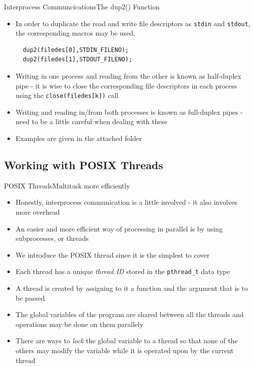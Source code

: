 \documentclass{beamer}
\begin{document}
\begin{frame}[fragile]{Interprocess Communcications}{The dup2()
    Function}
  \begin{itemize}
    \item In order to duplicate the read and write file descriptors as
      \verb|stdin| and \verb|stdout|, the corresponding macros may be
      used,
\begin{verbatim}
  dup2(filedes[0],STDIN_FILENO);
  dup2(filedes[1],STDOUT_FILENO); 
\end{verbatim}
  \item Writing in one process and reading from the other is known as
    half-duplex pipe - it is wise to close the corresponding file
    descriptors in each process using the \verb|close(filedes[k])| call
  \item Writing and reading in/from both processes is known as
    full-duplex pipes - need to be a little careful when dealing with
    these
  \item Examples are given in the attached folder
  \end{itemize}
\end{frame}

\subsection{Working with POSIX Threads}
\begin{frame}[fragile]{POSIX Threads}{Multitask more efficiently}
  \begin{itemize}
    \item Honestly, interprocess communication is a little involved -
      it also involves more overhead
    \item An easier and more efficient way of processing in parallel
      is by using subprocesses, or threads
    \item We introduce the POSIX thread since it is the simplest to
      cover
    \item Each thread has a unique \emph{thread ID} stored in the
      \verb|pthread_t| data type
    \item A thread is created by assigning to it a function and the
      argument that is to be passed
    \item The global variables of the program are shared between all
      the threads and operations may be done on them parallely
    \item There are ways to \emph{lock} the global variable to a
      thread so that none of the others may modify the variable while
      it is operated upon by the current thread
  \end{itemize}
\end{frame}
\end{document}
